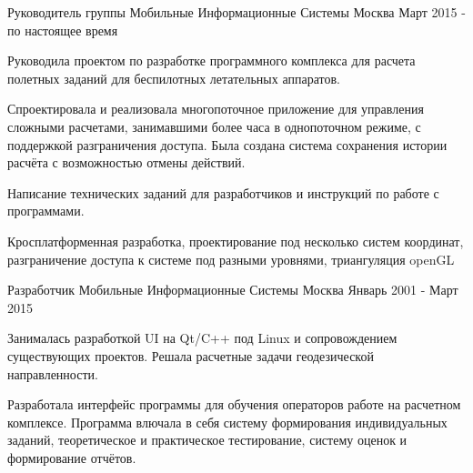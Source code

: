 

\begin{cventries}

  \cventry
    {Руководитель группы} %
    {Мобильные Информационные Системы} %
    {Москва} %
    {Март 2015 - по настоящее время} %
    {
      \begin{cvitems} %
        \item {Руководила проектом по разработке программного комплекса для расчета полетных заданий для беспилотных летательных аппаратов.}
        \item {Спроектировала и реализовала многопоточное приложение для управления сложными расчетами, занимавшими более часа в однопоточном режиме, с поддержкой разграничения доступа. Была создана система сохранения истории расчёта с возможностью отмены действий.}
        \item {Написание технических заданий для разработчиков и инструкций по работе с программами.}
        \item {Кросплатформенная разработка, проектирование под несколько систем координат, разграничение доступа к системе под разными уровнями, триангуляция openGL}
      \end{cvitems}
    }
  \cventry
    {Разработчик} %
    {Мобильные Информационные Системы} %
    {Москва} %
    {Январь 2001 - Март 2015} %
    {
      \begin{cvitems} %
        \item {Занималась разработкой UI на Qt/C++ под Linux и сопровождением существующих проектов. Решала расчетные задачи геодезической направленности.}
        \item {Разработала интерфейс программы для обучения операторов работе на расчетном комплексе. Программа влючала в себя систему формирования индивидуальных заданий, теоретическое и практическое тестирование, систему оценок и формирование отчётов.}
      \end{cvitems}
    }    

\end{cventries}
